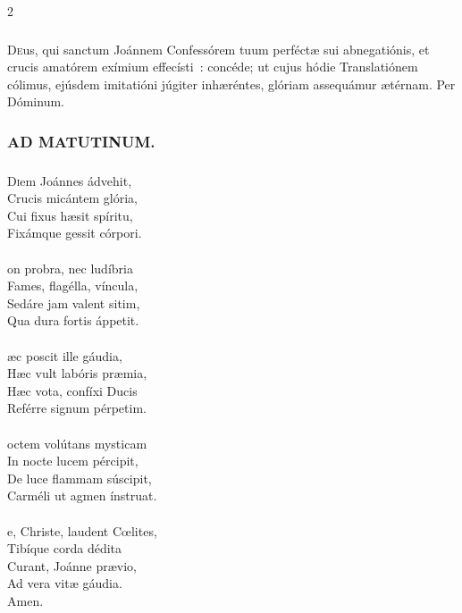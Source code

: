 \documentclass[9pt,twoside]{extarticle}
\begin{document}
\begin{multicols}{2}
{\subsubsection*{\center {}}
\lettrine{D}eus, qui sanctum Joánnem Confessórem tuum perféctæ sui abnegatiónis, et crucis amatórem exímium effecísti~: concéde; ut cujus hódie Translatiónem cólimus, ejúsdem imitatióni júgiter inhæréntes, glóriam assequámur ætérnam. Per Dóminum.

\subsubsection*{\center \textsc{AD MATUTINUM.}}
\subsubsection*{\center {}}
\lettrine{D}iem Joánnes ádvehit,\\
Crucis micántem glória,\\
Cui fixus hæsit spíritu,\\
Fixámque gessit córpori.\\
\\
on probra, nec ludíbria\\
Fames, flagélla, víncula,\\
Sedáre jam valent sitim,\\
Qua dura fortis áppetit.\\
\\
æc poscit ille gáudia,\\
Hæc vult labóris præmia,\\
Hæc vota, confíxi Ducis\\
Reférre signum pérpetim.\\
\\
octem volútans mysticam\\
In nocte lucem pércipit,\\
De luce flammam súscipit,\\
Carméli ut agmen ínstruat.\\
\\
e, Christe, laudent Cœlites,\\
Tibíque corda dédita\\
Curant, Joánne prævio,\\
Ad vera vitæ gáudia.\\
Amen.

\begin{tightlist}{}
\item {}
\end{tightlist}

}
\end{multicols}
\end{document}
